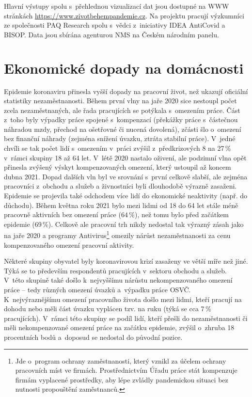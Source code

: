 Hlavní výstupy spolu s přehlednou vizualizací dat jsou dostupné na WWW stránkách \url{https://www.zivotbehempandemie.cz}. Na projektu pracují výzkumníci ze společnosti PAQ Research spolu s vědci z iniciativy IDEA AntiCovid a BISOP. Data jsou sbírána agenturou NMS na Českém národním panelu.

\section*{Ekonomické dopady na domácnosti}
\label{Ekonomicke_dopady}

Epidemie koronaviru přinesla vyšší dopady na pracovní život, než ukazují oficiální statistiky nezaměstnanosti. Během první vlny na jaře 2020 sice nestoupl počet zcela nezaměstnaných, ale řada pracujících se potýkala s~omezením práce. Část z~toho byly výpadky práce spojené s kompenzací (překážky práce s~částečnou náhradou mzdy, přechod na ošetřovné či nucená dovolená), zčásti šlo o~omezení bez finanční náhrady (zejména snížení úvazku, ztráta stabilní práce). V~jedné chvíli se tak počet lidí s~omezením v~práci zvýšil z~předkrizových 8 na 27\,\% v rámci skupiny 18 až 64 let. V~létě 2020 nastalo oživení, ale podzimní vlna opět přinesla zvýšený výskyt kompenzovaných omezení, který ustoupil až koncem dubna 2021. Dopad dalších vln byl ve srovnání s~první celkově slabší, ale zejména pracovníci z~obchodu a služeb a živnostníci byli dlouhodobě výrazně zasaženi. Epidemie se projevila také odchodem více lidí do ekonomické neaktivity (např. do důchodu). Během května roku 2021 bylo mezi lidmi od 18 do 64 let stále méně pracovně aktivních bez omezení práce (64\,\%), než tomu bylo před začátkem epidemie (69\,\%). Celkově ale pracovní trh nikdy nedostal tak výrazný zásah jako na jaře 2020 a programy Antivirus\footnote{Jde o~program ochrany zaměstnanosti, který vznikl za účelem ochrany pracovních míst ve firmách. Prostřednictvím Úřadu práce stát kompenzuje firmám vyplacené prostředky, aby lépe zvládly pandemickou situaci bez nutnosti propouštění zaměstnanců.} omezily nárůst nezaměstnanosti za cenu kompenzovaného omezení pracovní aktivity.

Některé skupiny obyvatel byly koronavirovou krizí zasaženy ve větší míře než jiné. Týká se to především respondentů pracujících v sektoru obchodu a služeb. V této skupině také došlo k nejvyššímu nárůstu nekompenzovaného omezení práce – tedy různých omezení úvazků a výpadku práce OSVČ. K nejvýraznějšímu omezení pracovního života došlo mezi lidmi, kteří pracují na dohodu nebo měli část úvazku vyplácen tzv. na ruku (týká se cca 7\,\% pracujících). V rámci této skupiny se podíl lidí, kteří přešli do nezaměstnanosti či měli nekompenzované omezení práce na začátku epidemie, zvýšil o~zhruba 18 procentních bodů a doposud se nedostal do původní pozice.


